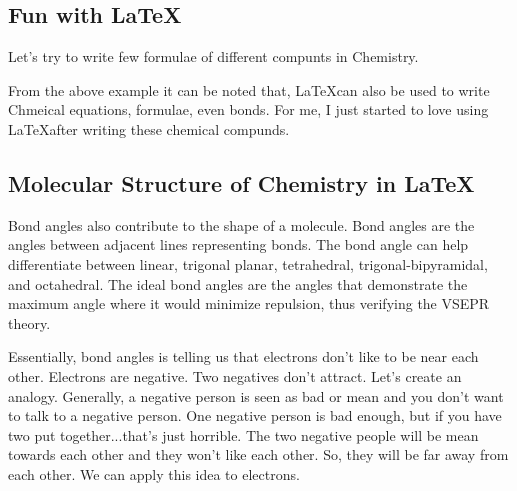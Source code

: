 \documentclass[12pt, a4paper]{article}
\begin{document}
\subsection*{Fun with \LaTeX\ }
Let's try to write few formulae of different compunts in Chemistry.












\noindent
From the above example it can be noted that, \LaTeX can also be used to write Chmeical equations, formulae, even bonds. For me, I just started to love using \LaTeX after writing these chemical compunds.

\subsection*{Molecular Structure of Chemistry in \LaTeX\ }

Bond angles also contribute to the shape of a molecule. Bond angles are the angles between adjacent lines representing bonds. The bond angle can help differentiate between linear, trigonal planar, tetrahedral, trigonal-bipyramidal, and octahedral. The ideal bond angles are the angles that demonstrate the maximum angle where it would minimize repulsion, thus verifying the VSEPR theory.
\vspace{.7cm}






\break

\noindent
Essentially, bond angles is telling us that electrons don't like to be near each other. Electrons are negative. Two negatives don't attract. Let's create an analogy. Generally, a negative person is seen as bad or mean and you don't want to talk to a negative person. One negative person is bad enough, but if you have two put together...that's just horrible. The two negative people will be mean towards each other and they won't like each other. So, they will be far away from each other. We can apply this idea to electrons. 
\end{document}
